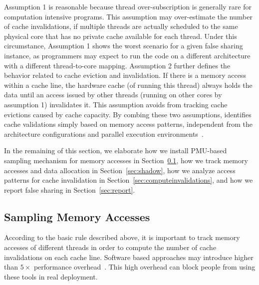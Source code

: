Assumption 1 is reasonable because thread over-subscription is generally rare for computation intensive programs. This assumption may over-estimate the number of cache invalidations, if multiple threads are actually scheduled to the same physical core that has no private cache available for each thread. Under this circumstance, Assumption 1 shows the worst scenario for a given false sharing instance, as programmers may expect to run the code on a different architecture with a different thread-to-core mapping. 
Assumption 2 further defines the behavior related to cache eviction and invalidation. If there is a memory access within a cache line, the hardware cache (of running this thread) always holds the data until an access issued by other threads (running on other cores by assumption 1) invalidates it. This assumption avoids from tracking cache evictions caused by cache capacity. 
By combing these two assumptions, \cheetah{} identifies cache validations simply based on memory access patterns, independent from the architecture configurations and parallel execution environments~\cite{Predator, qinzhao}. 

In the remaining of this section, we elaborate how we install PMU-based sampling mechanism for memory accesses in Section~\ref{sec:perfcounter}, how we track memory accesses and data allocation in Section~\ref{sec:shadow}, how we analyze access patterns for cache invalidation in Section~\ref{sec:computeinvalidations}, and how we report false sharing in Section~\ref{sec:report}.

\subsection{Sampling Memory Accesses}
\label{sec:perfcounter}

According to the basic rule described above, it is important to track memory accesses of different threads in order to compute the number of cache invalidations on each cache line. Software based approaches may introduce higher than $5\times$ performance overhead~\cite{Predator, qinzhao}. This high overhead can block people from using these tools in real deployment.

